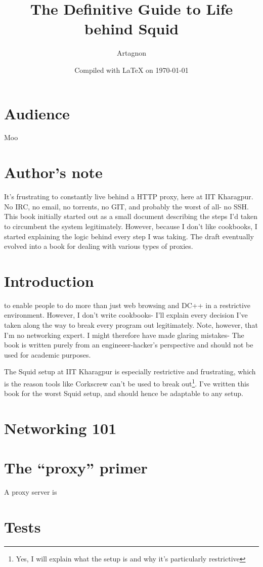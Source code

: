 \documentclass[8pt,draft]{report}
\begin{document}
\author{Artagnon}
\title{The Definitive Guide to Life behind Squid}
\date{Compiled with \LaTeX{} on \today}
\maketitle

\section{Audience}
Moo

\section{Author's note}
It's frustrating to constantly live behind a HTTP proxy, here at IIT Kharagpur. No IRC, no email, no torrents, no GIT, and probably the worst of all- no SSH. This book initially started out as a small document describing the steps I'd taken to circumbent the system legitimately. However, because I don't like cookbooks, I started explaining the logic behind every step I was taking. The draft eventually evolved into a book for dealing with various types of proxies.

\section{Introduction}
 to enable people to do more than just web browsing and DC++ in a restrictive environment. However, I don't write cookbooks-  I'll explain every decision I've taken along the way to break every program out legitimately. Note, however, that I'm no networking expert. I might therefore have made glaring mistakes- The book is written purely from an engineeer-hacker's perspective and should not be used for academic purposes.

The Squid setup at IIT Kharagpur is especially restrictive and frustrating, which is the reason tools like Corkscrew can't be used to break out\footnote{Yes, I will explain what the setup is and why it's particularly restrictive}. I've written this book for the worst Squid setup, and should hence be adaptable to any setup.

\section{Networking 101}

\section{The ``proxy'' primer}
A proxy server is 
\section{Tests}

\end{document}
